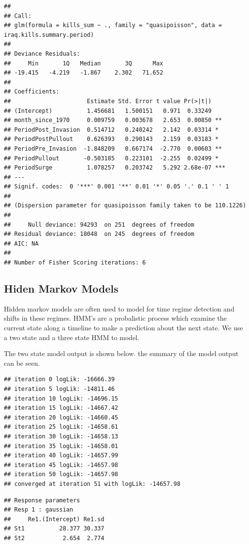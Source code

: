 \documentclass[]{article}
\begin{document}
\begin{verbatim}
## 
## Call:
## glm(formula = kills_sum ~ ., family = "quasipoisson", data = iraq.kills.summary.period)
## 
## Deviance Residuals: 
##     Min       1Q   Median       3Q      Max  
## -19.415   -4.219   -1.867    2.302   71.652  
## 
## Coefficients:
##                      Estimate Std. Error t value Pr(>|t|)    
## (Intercept)          1.456681   1.500151   0.971  0.33249    
## month_since_1970     0.009759   0.003678   2.653  0.00850 ** 
## PeriodPost_Invasion  0.514712   0.240242   2.142  0.03314 *  
## PeriodPostPullout    0.626393   0.290143   2.159  0.03183 *  
## PeriodPre_Invasion  -1.848209   0.667174  -2.770  0.00603 ** 
## PeriodPullout       -0.503185   0.223101  -2.255  0.02499 *  
## PeriodSurge          1.078257   0.203742   5.292 2.68e-07 ***
## ---
## Signif. codes:  0 '***' 0.001 '**' 0.01 '*' 0.05 '.' 0.1 ' ' 1
## 
## (Dispersion parameter for quasipoisson family taken to be 110.1226)
## 
##     Null deviance: 94293  on 251  degrees of freedom
## Residual deviance: 18048  on 245  degrees of freedom
## AIC: NA
## 
## Number of Fisher Scoring iterations: 6
\end{verbatim}

\subsection{Hiden Markov Models}\label{hiden-markov-models}

Hidden markov models are often used to model for time regime detection
and shifts in these regimes. HMM's are a probalistic process which
examine the current state along a timeline to make a prediction about
the next state. We use a two state and a three state HMM to model.

The two state model output is shown below. the summary of the model
output can be seen.

\begin{verbatim}
## iteration 0 logLik: -16666.39 
## iteration 5 logLik: -14811.46 
## iteration 10 logLik: -14696.15 
## iteration 15 logLik: -14667.42 
## iteration 20 logLik: -14660.45 
## iteration 25 logLik: -14658.61 
## iteration 30 logLik: -14658.13 
## iteration 35 logLik: -14658.01 
## iteration 40 logLik: -14657.99 
## iteration 45 logLik: -14657.98 
## iteration 50 logLik: -14657.98 
## converged at iteration 51 with logLik: -14657.98
\end{verbatim}

\begin{verbatim}
## Response parameters 
## Resp 1 : gaussian 
##     Re1.(Intercept) Re1.sd
## St1          28.377 30.337
## St2           2.654  2.774
\end{verbatim}
\end{document}
